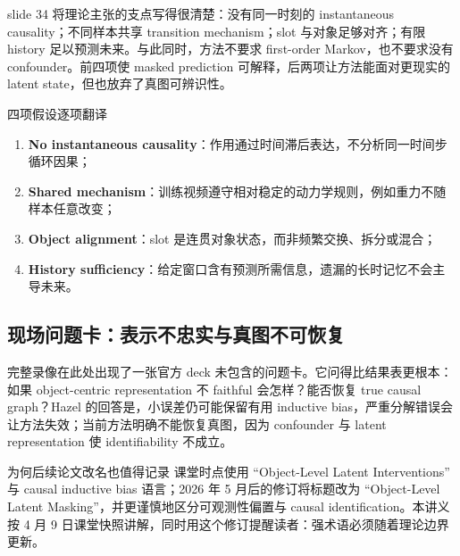 slide 34 将理论主张的支点写得很清楚：没有同一时刻的 instantaneous causality；不同样本共享 transition mechanism；slot 与对象足够对齐；有限 history 足以预测未来。与此同时，方法不要求 first-order Markov，也不要求没有 confounder。前四项使 masked prediction 可解释，后两项让方法能面对更现实的 latent state，但也放弃了真图可辨识性。


\begin{knowledgebox}{四项假设逐项翻译}
\begin{enumerate}
  \item \textbf{No instantaneous causality}：作用通过时间滞后表达，不分析同一时间步循环因果；
  \item \textbf{Shared mechanism}：训练视频遵守相对稳定的动力学规则，例如重力不随样本任意改变；
  \item \textbf{Object alignment}：slot 是连贯对象状态，而非频繁交换、拆分或混合；
  \item \textbf{History sufficiency}：给定窗口含有预测所需信息，遗漏的长时记忆不会主导未来。
\end{enumerate}
\end{knowledgebox}

\subsection{现场问题卡：表示不忠实与真图不可恢复}

完整录像在此处出现了一张官方 deck 未包含的问题卡。它问得比结果表更根本：如果 object-centric representation 不 faithful 会怎样？能否恢复 true causal graph？Hazel 的回答是，小误差仍可能保留有用 inductive bias，严重分解错误会让方法失效；当前方法明确不能恢复真图，因为 confounder 与 latent representation 使 identifiability 不成立。



\begin{importantbox}{为何后续论文改名也值得记录}
课堂时点使用 ``Object-Level Latent Interventions'' 与 causal inductive bias 语言；2026 年 5 月后的修订将标题改为 ``Object-Level Latent Masking''，并更谨慎地区分可观测性偏置与 causal identification。本讲义按 4 月 9 日课堂快照讲解，同时用这个修订提醒读者：强术语必须随着理论边界更新。
\end{importantbox}

